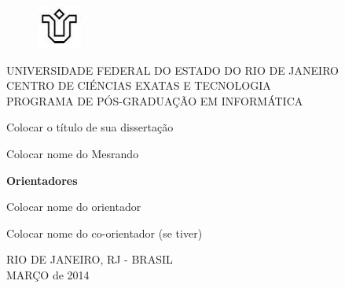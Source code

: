 \begin{figure}[!h]
    \centering
    \includegraphics[scale=1.0]{unirio.png}
\end{figure}
\begin{center}
    UNIVERSIDADE FEDERAL DO ESTADO DO RIO DE JANEIRO \\ CENTRO DE CIÉNCIAS EXATAS E TECNOLOGIA \\ PROGRAMA DE PÓS-GRADUAÇÃO EM INFORMÁTICA
    \vskip 7.0cm

    Colocar o título de sua dissertação
    \vskip 1.0cm

    Colocar nome do Mesrando
    \vskip 2.0cm
\end{center}
\begin{flushright}
    \textbf{Orientadores}

    Colocar nome do orientador

    Colocar nome do co-orientador (se tiver)
\end{flushright}
\begin{center}
    RIO DE JANEIRO, RJ - BRASIL \\ MARÇO de 2014
\end{center}
